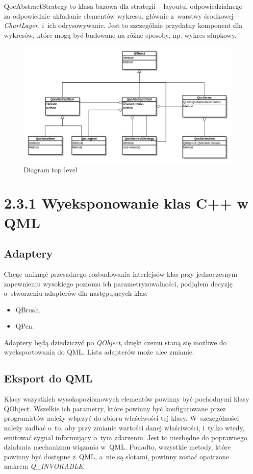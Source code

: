 \documentclass[11pt,twoside,a4paper,final]{llncs}
\begin{document}
QocAbstractStrategy to klasa bazowa dla strategii -- layoutu, odpowiedzialnego za odpowiednie układanie elementów wykresu, głównie z~warstwy środkowej -- \textit{ChartLayer}, i~ich odrysowywanie. Jest to szczególnie przydatny komponent dla wykresów, które mogą być budowane na różne sposoby, np. wykres słupkowy.


\begin{figure}
\centering
\caption{Diagram top level}\label{rys:klasy:top_level}
\includegraphics[scale=0.4]{klasy-top_level.png}
\end{figure}


\section{2.3.1 Wyeksponowanie klas C++ w QML}
\subsection{Adaptery}
Chcąc uniknąć przesadnego rozbudowania interfejsów klas przy jednoczesnym zapewnieniu wysokiego poziomu ich parametryzowalności, podjąłem decyzję o~stworzeniu adapterów dla następujących klas:
\begin{itemize}  
\item{QBrush,}
\item{QPen.}
\end{itemize}
Adaptery będą dziedziczyć po \textit{QObject}, dzięki czemu staną się możliwe do wyeksportowania do QML. Lista adapterów może ulec zmianie.

\subsection{Eksport do QML}
Klasy wszystkich wysokopoziomowych elementów powinny być pochodnymi klasy QObject. Wszelkie ich parametry, które powinny być konfigurowane przez programistów należy włączyć do zbioru właściwości tej klasy. W~szczególności należy zadbać o~to, aby przy zmianie wartości danej właściwości, i~tylko wtedy, emitować sygnał informujący o~tym zdarzeniu. Jest to niezbędne do poprawnego działania mechanizmu wiązania w~QML. Ponadto, wszystkie metody, które powinny być dostępne z~QML, a~nie są slotami, powinny zostać opatrzone makrem \textit{Q\_INVOKABLE}.
\end{document}
